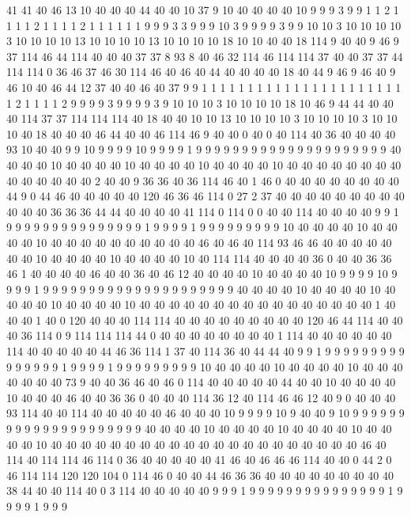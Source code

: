 41 41 40 46 13 10 40 40 40 44 40 40 10 37 9 10 40 40 40 40
10 9 9 9 3 9 9 1 1 2 1 1 1 1 2 1 1 1 1 2
1 1 1 1 1 1 9 9 9 3 3 9 9 9 10 3 9 9 9 9
3 9 9 10 10 3 10 10 10 10 3 10 10 10 10 13 10 10 10 10
13 10 10 10 10 18 10 10 40 40 18 114 9 40 40 9 46 9 37 114
46 44 114 40 40 40 37 37 8 93 8 40 46 32 114 46 114 114 37 40
40 37 37 44 114 114 0 36 46 37 46 30 114 46 40 46 40 44 40 40
40 40 18 40 44 9 46 9 46 40 9 46 10 40 46 44 12 37 40 40
46 40 37 9 9 1 1 1 1 1 1 1 1 1 1 1 1 1 1 1
1 1 1 1 1 1 1 1 2 1 1 1 1 2 9 9 9 9 3 9
9 9 9 3 9 10 10 10 3 10 10 10 10 18 10 46 9 44 44 40
40 40 114 37 37 114 114 114 40 18 40 40 10 10 13 10 10 10 10 3
10 10 10 10 3 10 10 10 40 18 40 40 40 46 44 40 40 46 114 46
9 40 40 0 40 0 40 114 40 36 40 40 40 40 93 10 40 40 9 9
10 9 9 9 9 10 9 9 9 9 1 9 9 9 9 9 9 9 9 9
9 9 9 9 9 9 9 9 9 9 9 9 40 40 40 40 10 40 40 40
40 10 40 40 40 40 10 40 40 40 40 10 40 40 40 40 40 40 40 40
40 40 40 40 40 40 2 40 40 9 36 36 40 36 114 46 40 1 46 0
40 40 40 40 40 40 40 40 44 9 0 44 46 40 40 40 40 40 120 46
36 46 114 0 27 2 37 40 40 40 40 40 40 40 40 40 40 40 40 36
36 36 44 44 40 40 40 40 41 114 0 114 0 0 40 40 114 40 40 40
40 9 9 1 9 9 9 9 9 9 9 9 9 9 9 9 9 9 9 1
9 9 9 9 1 9 9 9 9 9 9 9 9 9 10 40 40 40 40 10
40 40 40 40 10 40 40 40 40 40 40 40 40 40 40 46 40 46 40 114
93 46 46 40 40 40 40 40 40 40 10 40 40 40 40 10 40 40 40 40
10 40 114 114 40 40 40 40 36 0 40 40 36 36 46 1 40 40 40 40
46 40 40 36 40 46 12 40 40 40 40 10 40 40 40 40 10 9 9 9
9 10 9 9 9 9 1 9 9 9 9 9 9 9 9 9 9 9 9 9
9 9 9 9 9 9 9 9 40 40 40 40 10 40 40 40 40 10 40 40
40 40 10 40 40 40 40 10 40 40 40 40 40 40 40 40 40 40 40 40
40 40 40 40 1 40 40 40 1 40 0 120 40 40 40 114 114 40 40 40
40 40 40 40 40 40 120 46 44 114 40 40 40 36 114 0 9 114 114 114
44 0 40 40 40 40 40 40 40 40 1 114 40 40 40 40 40 40 114 40
40 40 40 40 44 46 36 114 1 37 40 114 36 40 44 44 40 9 9 1
9 9 9 9 9 9 9 9 9 9 9 9 9 9 9 1 9 9 9 9
1 9 9 9 9 9 9 9 9 9 10 40 40 40 40 10 40 40 40 40
10 40 40 40 40 40 40 40 73 9 40 40 36 46 40 46 0 114 40 40
40 40 40 44 40 40 10 40 40 40 40 10 40 40 40 46 40 40 36 36
0 40 40 40 114 36 12 40 114 46 46 12 40 9 0 40 40 40 93 114
40 40 114 40 40 40 40 40 46 40 40 40 10 9 9 9 9 10 9 40
40 9 10 9 9 9 9 9 9 9 9 9 9 9 9 9 9 9 9 9
9 9 9 9 40 40 40 40 10 40 40 40 40 10 40 40 40 40 10 40
40 40 40 10 40 40 40 40 40 40 40 40 40 40 40 40 40 40 40 40
40 40 40 40 40 46 40 114 40 114 114 46 114 0 36 40 40 40 40 40
41 46 40 46 46 46 114 40 40 0 44 2 0 46 114 114 120 120 104 0
114 46 0 40 40 44 46 36 36 40 40 40 40 40 40 40 40 40 38 44
40 40 114 40 0 3 114 40 40 40 40 40 9 9 9 1 9 9 9 9
9 9 9 9 9 9 9 9 9 9 9 1 9 9 9 9 1 9 9 9
